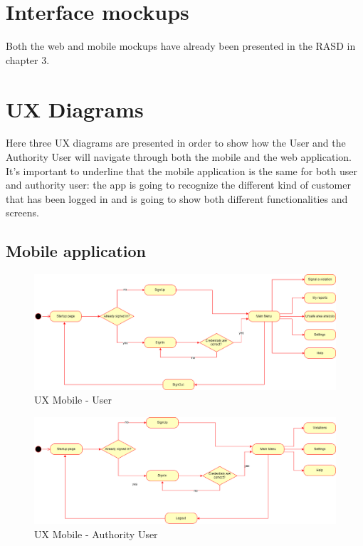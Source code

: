     \section{Interface mockups}
    Both the web and mobile mockups have already been presented in the RASD in
    chapter 3. \\
    
    \section{UX Diagrams}
    Here three UX diagrams are presented in order to show how the User and the
    Authority User will navigate through both the mobile and the web
    application. It's important to underline that the mobile application is the
    same for both user and authority user: the app is going to recognize the
    different kind of customer that has been logged in and is going to show both
    different functionalities and screens.
        \subsection{Mobile application}
        \begin{figure}[H]
            \includegraphics[scale = 0.35]{dd/resources/images/UX-diagram-mobile-user.png}
            \caption{UX Mobile - User}        
        \end{figure}   
        \begin{figure}[H]
            \includegraphics[scale = 0.35]{dd/resources/images/UX-diagram-mobile-authorityUser.png}
            \caption{UX Mobile - Authority User}        
        \end{figure}             
